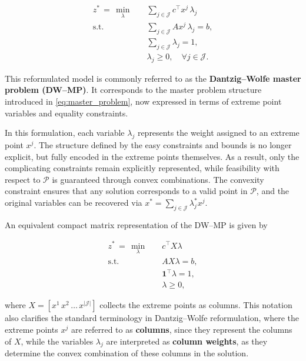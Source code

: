 \documentclass{book}
\theoremstyle{definition}
\numberwithin{algorithm_}{chapter}
\begin{document}
\begin{subequations}\label{eq:dwmp}
\begin{align}
z^* \, = \, \min_{\lambda} \quad & \sum_{j \in \mathcal{J}} c^\top x^j \, \lambda_j \label{eq:dwmp_obj} \\[0.5mm]
\text{s.t.} \quad & \sum_{j \in \mathcal{J}} A x^j \, \lambda_j = b, \label{eq:dwmp_comp} \\[0.5mm]
& \sum_{j \in \mathcal{J}} \lambda_j = 1, \label{eq:dwmp_conv} \\[0.5mm]
& \lambda_j \ge 0, \quad \forall j \in \mathcal{J} \label{eq:dwmp_nonneg}.
\end{align}
\end{subequations}

This reformulated model is commonly referred to as the \textbf{Dantzig--Wolfe master problem (DW--MP)}. It corresponds to the master problem structure introduced in \eqref{eq:master_problem}, now expressed in terms of extreme point variables and equality constraints.

\bigskip

In this formulation, each variable $\lambda_j$ represents the weight assigned to an extreme point $x^j$. The structure defined by the easy constraints and bounds is no longer explicit, but fully encoded in the extreme points themselves. As a result, only the complicating constraints remain explicitly represented, while feasibility with respect to $\mathcal{P}$ is guaranteed through convex combinations. The convexity constraint ensures that any solution corresponds to a valid point in $\mathcal{P}$, and the original variables can be recovered via $x^* = \sum_{j \in \mathcal{J}} \lambda_j^* x^j$.

\bigskip

An equivalent compact matrix representation of the DW--MP is given by

\begin{subequations}\label{eq:compact_dwmp}
\begin{align}
z^* \, = \, \min_{\lambda} \quad & c^\top X \lambda \\[0.5mm]
\text{s.t.} \quad & AX \lambda = b, \\[0.5mm]
& \mathbf{1}^\top \lambda = 1, \\[0.5mm]
& \lambda \ge 0,
\end{align}
\end{subequations}

where $X = [x^1 \, x^2 \, \dots \, x^{|\mathcal{J}|}]$ collects the extreme points as columns. This notation also clarifies the standard terminology in Dantzig--Wolfe reformulation, where the extreme points $x^j$ are referred to as \textbf{columns}, since they represent the columns of $X$, while the variables $\lambda_j$ are interpreted as \textbf{column weights}, as they determine the convex combination of these columns in the solution.
\end{document}
